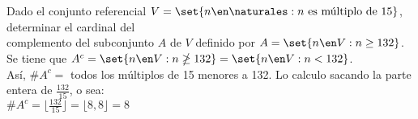 \ejercicio

Dado el conjunto referencial $V = \set{n \en \naturales : n \text{ es múltiplo de } 15}$, determinar el cardinal del\\
complemento del subconjunto $A$ de $V$ definido por $A = \set{n \en V : n \geq 132}$.\\

Se tiene que $A^c = \set{n \en V : n \ngeq 132} = \set{n \en V : n < 132}$.\\
Así, $\#A^c = $ todos los múltiplos de 15 menores a 132. Lo calculo sacando la parte entera de $\frac{132}{15}$, o sea:\\

$\#A^c = \lfloor \frac{132}{15} \rfloor = \lfloor 8,8 \rfloor = 8$